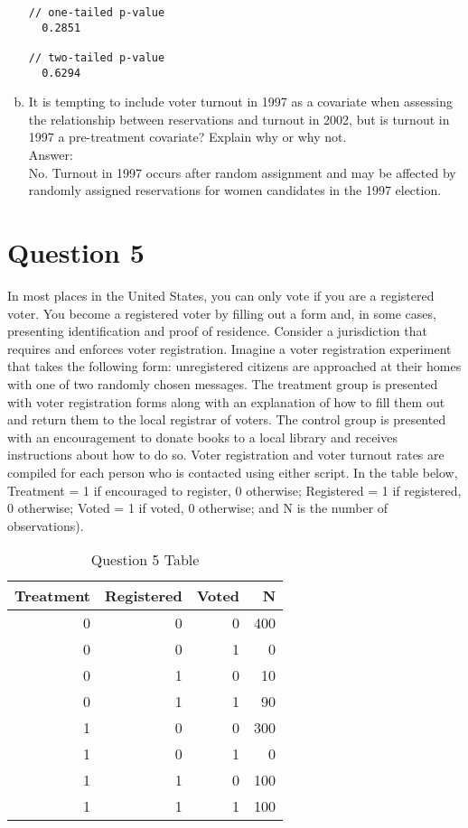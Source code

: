 \documentclass[11pt,notitlepage]{article}\usepackage[]{graphicx}\usepackage[]{color}
\makeatletter
\newenvironment{kframe}{%
 \def\at@end@of@kframe{}%
 \ifinner\ifhmode%
  \def\at@end@of@kframe{\end{minipage}}%
  \begin{minipage}{\columnwidth}%
 \fi\fi%
 \def\FrameCommand##1{\hskip\@totalleftmargin \hskip-\fboxsep
 \colorbox{shadecolor}{##1}\hskip-\fboxsep
     \hskip-\linewidth \hskip-\@totalleftmargin \hskip\columnwidth}%
 \MakeFramed {\advance\hsize-\width
   \@totalleftmargin\z@ \linewidth\hsize
   \@setminipage}}%
 {\par\unskip\endMakeFramed%
 \at@end@of@kframe}
\newenvironment{knitrout}{}{} %
\makeatother
\begin{document}
\begin{enumerate}[a)]
\begin{knitrout}
\begin{kframe}
\begin{Verbatim}[commandchars=\\\{\}]
// one-tailed p-value
  0.2851

// two-tailed p-value
  0.6294
    \end{Verbatim}
\end{kframe}
\end{knitrout}

\item It is tempting to include voter turnout in 1997 as a covariate when assessing the relationship between reservations and turnout in 2002, but is turnout in 1997 a pre-treatment covariate? Explain why or why not.\\
Answer:\\
No. Turnout in 1997 occurs after random assignment and may be affected by randomly assigned reservations for women candidates in the 1997 election.
\end{enumerate}

\section*{Question 5}
In most places in the United States, you can only vote if you are a registered voter. You become a registered voter by filling out a form and, in some cases, presenting identification and proof of residence. Consider a jurisdiction that requires and enforces voter registration. Imagine a voter registration experiment that takes the following form: unregistered citizens are approached at their homes with one of two randomly chosen messages. The treatment group is presented with voter registration forms along with an explanation of how to fill them out and return them to the local registrar of voters. The control group is presented with an encouragement to donate books to a local library and receives instructions about how to do so. Voter registration and voter turnout rates are compiled for each person who is contacted using either script. In the table below, Treatment = 1 if encouraged to register, 0 otherwise; Registered = 1 if registered, 0 otherwise; Voted = 1 if voted, 0 otherwise; and N is the number of observations).

\begin{table}[H]
  \centering
  \caption{Question 5 Table}
    \begin{tabular}{rrrr}
    \toprule
    Treatment  & Registered  & Voted  & N  \\
    \midrule
    0     & 0     & 0     & 400 \\
    0     & 0     & 1     & 0 \\
    0     & 1     & 0     & 10 \\
    0     & 1     & 1     & 90 \\
    1     & 0     & 0     & 300 \\
    1     & 0     & 1     & 0 \\
    1     & 1     & 0     & 100 \\
    1     & 1     & 1     & 100 \\
    \bottomrule
    \end{tabular}%
  \label{tab:addlabel}%
\end{table}%
\end{document}
